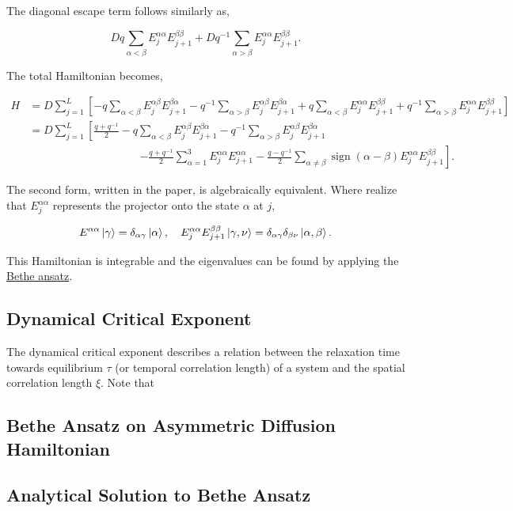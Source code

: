 \documentclass{article}
\begin{document}
The diagonal escape term follows similarly as,

\[Dq\sum_{\alpha<\beta} E^{\alpha\alpha}_{j} E^{\beta\beta}_{j+1} + Dq^{-1} \sum_{\alpha>\beta} E^{\alpha\alpha}_{j} E^{\beta\beta}_{j+1}.\]

The total Hamiltonian becomes,

\begin{align*} 
    H &= D\sum_{j=1}^L\left[-q\sum_{\alpha<\beta} E^{\alpha\beta}_j E^{\beta\alpha}_{j+1} - q^{-1}\sum_{\alpha>\beta} E^{\alpha\beta}_j E^{\beta\alpha}_{j+1} + q\sum_{\alpha<\beta} E^{\alpha\alpha}_{j} E^{\beta\beta}_{j+1} + q^{-1} \sum_{\alpha>\beta} E^{\alpha\alpha}_{j} E^{\beta\beta}_{j+1}\right] \\ 
    &= D \sum_{j=1}^{L} \left[ \frac{q+q^{-1}}{2} - q \sum_{\alpha<\beta} E_j^{\alpha\beta} E_{j+1}^{\beta\alpha} - q^{-1} \sum_{\alpha>\beta} E_j^{\alpha\beta} E_{j+1}^{\beta\alpha} \right. \\ 
    &\qquad\qquad\qquad\qquad\qquad \left. -\frac{q+q^{-1}}{2} \sum_{\alpha=1}^{3} E_j^{\alpha\alpha} E_{j+1}^{\alpha\alpha} - \frac{q-q^{-1}}{2} \sum_{\alpha\ne\beta} \operatorname{sign}(\alpha-\beta) E_j^{\alpha\alpha} E_{j+1}^{\beta\beta} \right]. 
\end{align*}

The second form, written in the paper, is algebraically equivalent. Where realize that $E^{\alpha\alpha}_j$ represents the projector onto the state $\alpha$ at $j$,

\[E^{\alpha\alpha}\ket{\gamma} = \delta_{\alpha\gamma}\ket{\alpha}, \quad E^{\alpha\alpha}_j E^{\beta\beta}_{j+1} \ket{\gamma, \nu} = \delta_{\alpha\gamma}\delta_{\beta\nu}\ket{\alpha,\beta}.\]

This Hamiltonian is integrable and the eigenvalues can be found by applying the \hyperref[sec:bethe-ansatz-on-asym-hamiltonian]{Bethe ansatz}.

\subsection{Dynamical Critical Exponent}

The dynamical critical exponent describes a relation between the relaxation time towards equilibrium $\tau$ (or temporal correlation length) of a system and the spatial correlation length $\xi$. Note that 

\subsection{Bethe Ansatz on Asymmetric Diffusion Hamiltonian}
\label{sec:bethe-ansatz-on-asym-hamiltonian}

\subsection{Analytical Solution to Bethe Ansatz}
\end{document}
